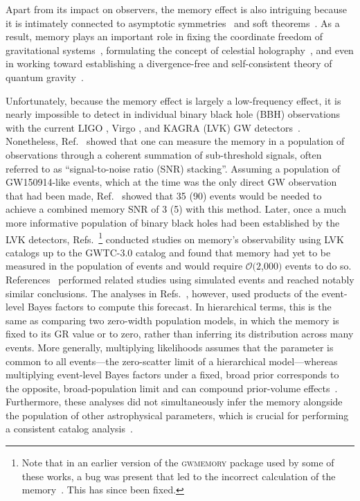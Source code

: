 \documentclass[aps,prd,reprint,twocolumn,10pt,eqsecnum,showpacs,nofootinbib,amsfonts,amssymb,amsmath,longbibliography,superscriptaddress,floatfix]{revtex4-1}
\begin{document}
 Apart from its impact on observers, the memory effect is also intriguing because it is intimately connected to asymptotic symmetries~\cite{Newman:1966ub,Ashtekar:1981bq,Geroch:1981ut,Dray:1984rfa,Ludvigsen:1989kg,Flanagan:2014kfa,Goncharov:2023woe} and soft theorems~\cite{Weinberg:1965nx,Strominger:2013jfa,Strominger:2014pwa}. As a result, memory plays an important role in fixing the coordinate freedom of gravitational systems~\cite{Mitman:2021xkq,Mitman:2022kwt}, formulating the concept of celestial holography~\cite{Strominger:2017zoo,Raclariu:2021zjz,Pasterski:2021raf,Pasterski:2021rjz}, and even in working toward establishing a divergence-free and self-consistent theory of quantum gravity~\cite{Prabhu:2022zcr}.

Unfortunately, because the memory effect is largely a low-frequency effect, it is nearly impossible to detect in individual binary black hole (BBH) observations with the current LIGO \cite{LIGOScientific:2014pky}, Virgo \cite{VIRGO:2014yos}, and KAGRA \cite{KAGRA:2020tym} (LVK) GW detectors~\cite{Lasky:2016knh}.  Nonetheless, Ref.~\cite{Lasky:2016knh} showed that one can measure the memory in a population of observations through a coherent summation of sub-threshold signals, often referred to as ``signal-to-noise ratio (SNR) stacking''. Assuming a population of GW150914-like events, which at the time was the only direct GW observation that had been made, Ref.~\cite{Lasky:2016knh} showed that 35 (90) events would be needed to achieve a combined memory SNR of 3 (5) with this method. Later, once a much more informative population of binary black holes had been established by the LVK detectors, Refs.~\cite{Hubner:2019sly,Hubner:2021amk,Cheung:2024zow}\footnote{Note that in an earlier version of the \textsc{gwmemory} package used by some of these works, a bug was present that led to the incorrect calculation of the memory~\cite{Talbot:2018sgr}. This has since been fixed.} conducted studies on memory's observability using LVK catalogs up to the GWTC-3.0 catalog and found that memory had yet to be measured in the population of events and would require $\mathcal{O}(2$,$000)$ events to do so. References~\cite{Boersma:2020gxx,Grant:2022bla} performed related studies using simulated events and reached notably similar conclusions. The analyses in Refs.~\cite{Hubner:2019sly,Boersma:2020gxx,Hubner:2021amk,Grant:2022bla}, however, used products of the event-level Bayes factors to compute this forecast. In hierarchical terms, this is the same as comparing two zero-width population models, in which the memory is fixed to its GR value or to zero, rather than inferring its distribution across many events. More generally, multiplying likelihoods assumes that the parameter is common to all events---the zero-scatter limit of a hierarchical model---whereas multiplying event-level Bayes factors under a fixed, broad prior corresponds to the opposite, broad-population limit and can compound prior-volume effects~\cite{Zimmerman:2019wzo,Isi:2019asy,Isi:2022cii}. Furthermore, these analyses did not simultaneously infer the memory alongside the population of other astrophysical parameters, which is crucial for performing a consistent catalog analysis~\cite{Payne:2023kwj}.
\end{document}
